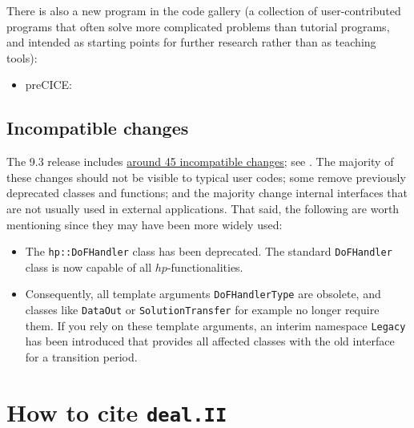 \documentclass{ansarticle-preprint}
\newcommand{\specialword}[1]{\texttt{#1}}
\newcommand{\dealii}{{\specialword{deal.II}}\xspace}
\begin{document}
There is also a new program in the code gallery (a collection of
user-contributed programs that often solve more complicated problems
than tutorial programs, and intended as starting points for further
research rather than as teaching tools):
\begin{itemize}
  \item preCICE: 
\end{itemize}



\subsection{Incompatible changes}\label{subsec:deprecated}

The 9.3 release includes
\href{https://dealii.org/developer/doxygen/deal.II/changes_between_9_2_0_and_9_3_0.html}
{around 45 incompatible changes}; see \cite{changes93}. The majority of these changes
should not be visible to typical user codes; some remove previously
deprecated classes and functions; and the majority change internal
interfaces that are not usually used in external
applications. That said, the following are worth mentioning since they
may have been more widely used:
\begin{itemize}
  \item The \texttt{hp::DoFHandler} class has been deprecated. The standard
        \texttt{DoFHandler} class is now capable of all $hp$-functionalities.
  \item Consequently, all template arguments \texttt{DoFHandlerType} are obsolete,
        and classes like \texttt{DataOut} or \texttt{SolutionTransfer} for example
        no longer require them. If you rely on these template arguments, an interim
        namespace \texttt{Legacy} has been introduced that provides all affected
        classes with the old interface for a transition period.
\end{itemize}



\section{How to cite \dealii}\label{sec:cite}
\end{document}
